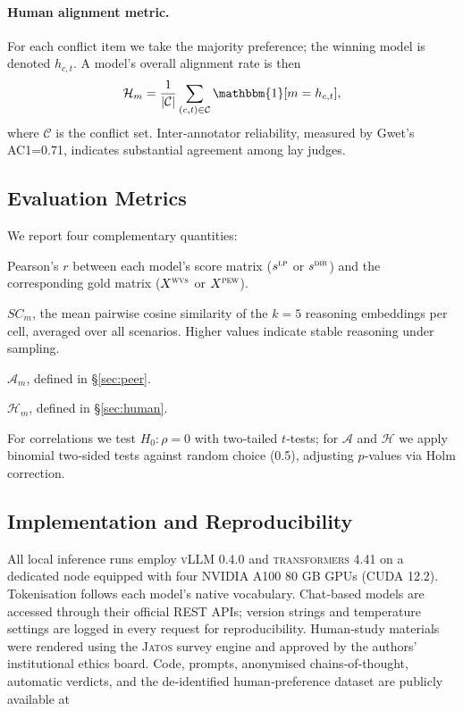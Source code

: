 \documentclass[11pt]{article}
\begin{document}
\paragraph{Human alignment metric.}
For each conflict item we take the majority preference; the winning model is denoted $h_{c,t}$.  
A model’s overall alignment rate is then  
\[
\mathcal{H}_{m} = \frac{1}{\lvert\mathcal{C}\rvert}\sum_{(c,t)\in\mathcal{C}}\mathbbm{1}[m=h_{c,t}],
\] 
where $\mathcal{C}$ is the conflict set.  
Inter‑annotator reliability, measured by Gwet’s AC1=0.71, indicates substantial agreement among lay judges.

\subsection{Evaluation Metrics}
\label{sec:metrics}

We report four complementary quantities:

\begin{description}[leftmargin=0.5cm]
  \item[Survey alignment] Pearson’s $r$ between each model’s score matrix ($s^{\textsc{lp}}$ or $s^{\textsc{dir}}$) and the corresponding gold matrix ($X^{\textsc{wvs}}$ or $X^{\textsc{pew}}$).
  \item[Self‑consistency] $SC_{m}$, the mean pairwise cosine similarity of the $k=5$ reasoning embeddings per cell, averaged over all scenarios.  Higher values indicate stable reasoning under sampling.
  \item[Peer‑agreement] $\mathcal{A}_{m}$, defined in \S\ref{sec:peer}.
  \item[Human alignment] $\mathcal{H}_{m}$, defined in \S\ref{sec:human}.
\end{description}

For correlations we test $H_0\!:\rho=0$ with two‑tailed $t$‑tests; for $\mathcal{A}$ and $\mathcal{H}$ we apply binomial two‑sided tests against random choice (0.5), adjusting $p$‑values via Holm correction.

\subsection{Implementation and Reproducibility}
\label{sec:impl}

All local inference runs employ \textsc{vLLM} 0.4.0 and \textsc{transformers} 4.41 on a dedicated node equipped with four NVIDIA A100 80 GB GPUs (CUDA 12.2).  
Tokenisation follows each model’s native vocabulary.  
Chat‑based models are accessed through their official REST APIs; version strings and temperature settings are logged in every request for reproducibility.  
Human‑study materials were rendered using the \textsc{Jatos} survey engine and approved by the authors’ institutional ethics board.  
Code, prompts, anonymised chains‑of‑thought, automatic verdicts, and the de‑identified human‑preference dataset are publicly available at  
\end{document}

